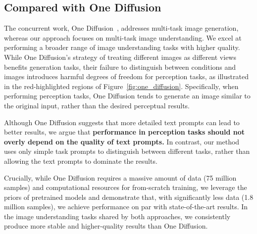 \subsection{Compared with One Diffusion}
\label{appendix:one_diffusion}
The concurrent work, One Diffusion~\cite{le2024diffusiongenerate}, addresses multi-task image generation, whereas our approach focuses on multi-task image understanding. We excel at performing a broader range of image understanding tasks with higher quality. While One Diffusion's strategy of treating different images as different views benefits generation tasks, their failure to distinguish between conditions and images introduces harmful degrees of freedom for perception tasks, as illustrated in the red-highlighted regions of Figure~\ref{fig:one_diffusion}. Specifically, when performing perception tasks, One Diffusion tends to generate an image similar to the original input, rather than the desired perceptual results.

Although One Diffusion suggests that more detailed text prompts can lead to better results, we argue that \textbf{performance in perception tasks should not overly depend on the quality of text prompts.} In contrast, our method uses only simple task prompts to distinguish between different tasks, rather than allowing the text prompts to dominate the results.

Crucially, while One Diffusion requires a massive amount of data (75 million samples) and computational resources for from-scratch training, we leverage the priors of pretrained models and demonstrate that, with significantly less data (1.8 million samples), we achieve performance on par with state-of-the-art results. In the image understanding tasks shared by both approaches, we consistently produce more stable and higher-quality results than One Diffusion.

